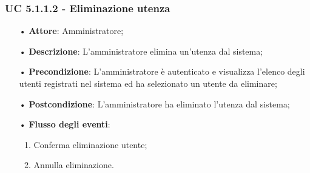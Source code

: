 \subsubsection{UC 5.1.1.2 - Eliminazione utenza}



\begin{itemize}
\item[•] \textbf{Attore}: Amministratore;
\item[•] \textbf{Descrizione}: L'amministratore elimina un'utenza dal sistema;
\item[•] \textbf{Precondizione}: L'amministratore \`{e} autenticato e visualizza l'elenco degli utenti registrati nel sistema ed ha selezionato un utente da eliminare;
\item[•] \textbf{Postcondizione}: L'amministratore ha eliminato l'utenza dal sistema; 
\item[•] \textbf{Flusso degli eventi}:

\begin{enumerate}
\item Conferma eliminazione utente;
\item Annulla eliminazione.
\end{enumerate}
\end{itemize}


